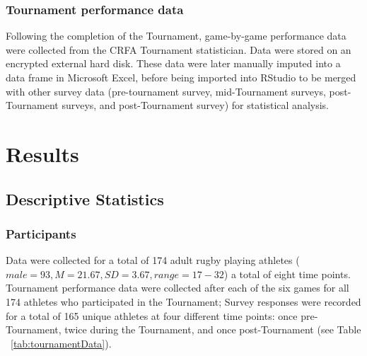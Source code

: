 \subsubsection{Tournament performance data}
Following the completion of the Tournament, game-by-game performance data were collected from the CRFA Tournament statistician. Data were stored on an encrypted external hard disk. These data were later manually imputed into a data frame in Microsoft Excel, before being imported into RStudio to be merged with other survey data (pre-tournament survey, mid-Tournament surveys, post-Tournament surveys, and post-Tournament survey) for statistical analysis.


















\section{Results}



\subsection{Descriptive Statistics}

  \subsubsection{Participants}

Data were collected for a total of 174 adult rugby playing athletes ($male = 93, M = 21.67, SD = 3.67, range = 17-32$) a total of eight time points. Tournament performance data were collected after each of the six games for all 174 athletes who participated in the Tournament;  Survey responses were recorded for a total of 165 unique athletes at four different time points: once pre-Tournament, twice during the Tournament, and once post-Tournament (see Table ~\ref{tab:tournamentData}).

